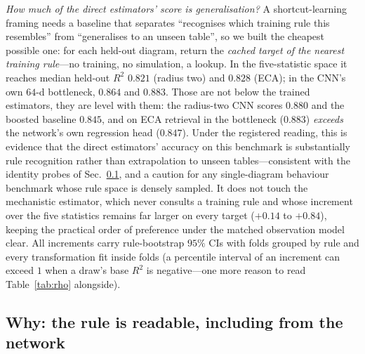 \documentclass[aip,cha,amsmath,amssymb,reprint,floatfix]{revtex4-2}
\newcommand{\rtwo}{$R^2$}
\begin{document}
\emph{How much of the direct estimators' score is generalisation?} A
shortcut-learning framing needs a baseline that separates ``recognises which
training rule this resembles'' from ``generalises to an unseen table'', so we
built the cheapest possible one: for each held-out diagram, return the
\emph{cached target of the nearest training rule}---no training, no
simulation, a lookup. In the five-statistic space it reaches median held-out
\rtwo{} $0.821$ (radius two) and $0.828$ (ECA); in the CNN's own $64$-d
bottleneck, $0.864$ and $0.883$. Those are not below the trained estimators,
they are level with them: the radius-two CNN scores $0.880$ and the boosted
baseline $0.845$, and on ECA retrieval in the bottleneck ($0.883$)
\emph{exceeds} the network's own regression head ($0.847$). Under the
registered reading, this is evidence that the direct estimators' accuracy on
this benchmark is substantially rule recognition rather than extrapolation to
unseen tables---consistent with the identity probes of
Sec.~\ref{sec:probes}, and a caution for any single-diagram behaviour
benchmark whose rule space is densely sampled. It does not touch the
mechanistic estimator, which never consults a training rule and whose
increment over the five statistics
remains far larger on every target ($+0.14$ to $+0.84$), keeping the
practical order of preference under the matched observation model clear. All
increments carry rule-bootstrap $95\%$ CIs with folds grouped by rule and
every transformation fit inside folds (a percentile interval of an increment
can exceed $1$ when a draw's base \rtwo{} is negative---one more reason to
read Table~\ref{tab:rho} alongside).

\subsection{Why: the rule is readable, including from the network}
\label{sec:probes}
\end{document}
